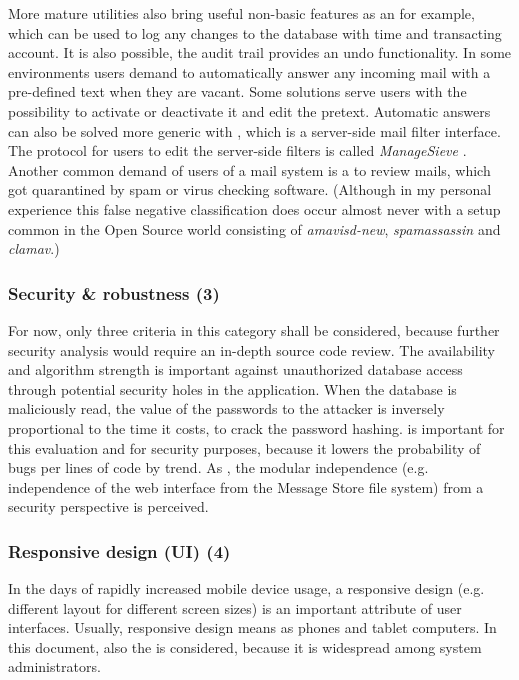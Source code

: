 \documentclass[12pt,a4paper]{scrartcl}
\begin{document}
				More mature utilities also bring useful non-basic features as
				an  for example, which can be used to
				log any changes to the database with time and transacting
				account. It is also possible, the audit trail provides an undo
				functionality. In some environments users demand  to automatically answer any incoming mail with
				a pre-defined text when they are vacant. Some solutions serve
				users with the possibility to activate or deactivate it and
				edit the pretext. Automatic answers can also be solved more
				generic with  \cite{sieve}, which is a
				server-side mail filter interface. The protocol for users to
				edit the server-side filters is called \emph{ManageSieve}
				\cite{managesieve}. Another common demand of users of a mail
				system is a  to review mails, which
				got quarantined by spam or virus checking software. (Although
				in my personal experience this false negative classification
				does occur almost never with a setup common in the Open Source
				world consisting of \emph{amavisd-new}, \emph{spamassassin} and
				\emph{clamav}.)

			\subsubsection*{Security \& robustness (3)}
				For now, only three criteria in this category shall be
				considered, because further security analysis would require an
				in-depth source code review. The 
				availability and algorithm strength is important against
				unauthorized database access through potential security holes
				in the application. When the database is maliciously read, the
				value of the passwords to the attacker is inversely
				proportional to the time it costs, to crack the password
				hashing.  is important for this
				evaluation and for security purposes, because it lowers the
				probability of bugs per lines of code by trend. As
				, the modular independence (e.g.
				independence of the web interface from the Message Store file
				system) from a security perspective is perceived.

			\subsubsection*{Responsive design (\acs{UI}) (4)}
				In the days of rapidly increased mobile device usage, a
				responsive design (e.g. different layout for different screen
				sizes) is an important attribute of user interfaces. Usually,
				responsive design means 
				as phones and tablet computers. In this document, also the
				 is considered,
				because it is widespread among system administrators.
\end{document}
